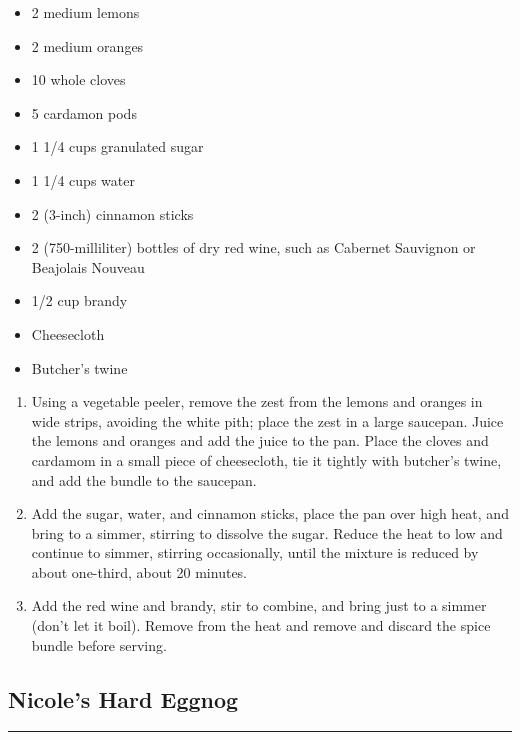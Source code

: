 \documentclass{article}
\begin{document}
\begin{framed}
    \begin{itemize}
        \item 2 medium lemons
        \item 2 medium oranges
        \item 10 whole cloves
        \item 5 cardamon pods
        \item 1 1/4 cups granulated sugar
        \item 1 1/4 cups water
        \item 2 (3-inch) cinnamon sticks
        \item 2 (750-milliliter) bottles of dry red wine, such as Cabernet Sauvignon or Beajolais Nouveau
        \item 1/2 cup brandy
        \item Cheesecloth
        \item Butcher's twine
    \end{itemize}
\end{framed}

\begin{enumerate}
    \item 
        Using a vegetable peeler, remove the zest from the lemons and oranges in wide strips, avoiding the white pith; place the zest in a large saucepan. Juice the lemons and oranges and add the juice to the pan. Place the cloves and cardamom in a small piece of cheesecloth, tie it tightly with butcher’s twine, and add the bundle to the saucepan.
    \item 
        Add the sugar, water, and cinnamon sticks, place the pan over high heat, and bring to a simmer, stirring to dissolve the sugar. Reduce the heat to low and continue to simmer, stirring occasionally, until the mixture is reduced by about one-third, about 20 minutes.
    \item 
        Add the red wine and brandy, stir to combine, and bring just to a simmer (don’t let it boil). Remove from the heat and remove and discard the spice bundle before serving.
\end{enumerate}
\newpage

\subsection{Nicole's Hard Eggnog} 
\noindent\rule[0.5ex]{\linewidth}{1pt}
\end{document}
